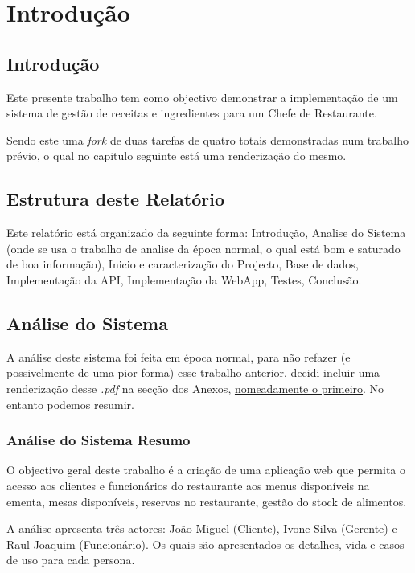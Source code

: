 \chapter{Introdução}

\section{Introdução}

Este presente trabalho tem como objectivo demonstrar a implementação de um sistema de gestão de receitas e ingredientes para um Chefe de Restaurante.

Sendo este uma \textit{fork} de duas tarefas de quatro totais demonstradas num trabalho prévio, o qual no capitulo seguinte está uma renderização do mesmo.

\section{Estrutura deste Relatório}

Este relatório está organizado da seguinte forma: Introdução, Analise do Sistema (onde se usa o trabalho de analise da época normal, o qual está bom e saturado de boa informação), Inicio e caracterização do Projecto, Base de dados, Implementação da API, Implementação da WebApp, Testes, Conclusão.

\section{Análise do Sistema}

A análise deste sistema foi feita em época normal, para não refazer (e possivelmente de uma pior forma) esse trabalho anterior, decidi incluir uma renderização desse \textit{.pdf} na secção dos Anexos, \hyperref[pdf:analysis]{nomeadamente o primeiro}. No entanto podemos resumir.

\subsection{Análise do Sistema Resumo}

O objectivo geral deste trabalho é a criação de uma aplicação web que permita o acesso aos clientes e funcionários do restaurante aos menus disponíveis na ementa, mesas disponíveis, reservas no restaurante, gestão do stock de alimentos.

A análise apresenta três actores: João Miguel (Cliente), Ivone Silva (Gerente) e Raul Joaquim (Funcionário). Os quais são apresentados os detalhes, vida e casos de uso para cada persona.

